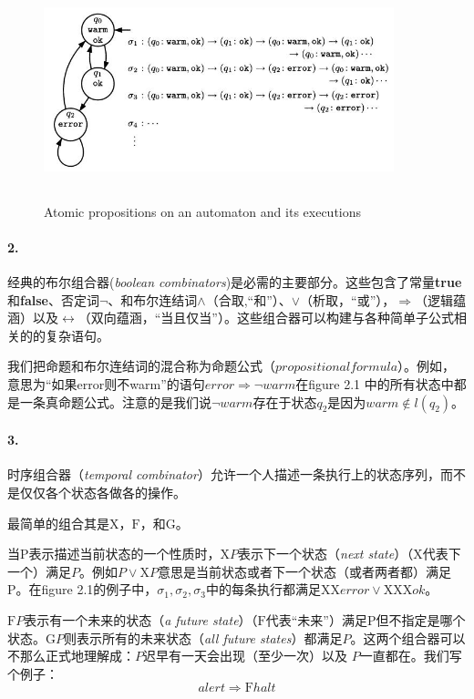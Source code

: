 \documentclass{book}
\begin{document}
    \begin{figure}
        \centering
        \includegraphics[height=2.5in,width=4.0in]{2_1.jpg}
        \caption{Atomic propositions on an automaton and its executions}
    \end{figure}

    \paragraph{2.} 经典的布尔组合器({\itshape boolean combinators})是必需的主要部分。这些包含了常量\textbf{true}和\textbf{false}、否定词$\neg$、和布尔连结词$\wedge$（合取,“和”）、$\vee$（析取，“或”），$\Rightarrow$（逻辑蕴涵）以及$\leftrightarrow$（双向蕴涵，“当且仅当”）。这些组合器可以构建与各种简单子公式相关的的复杂语句。

    我们把命题和布尔连结词的混合称为命题公式（$propositional formula$）。例如，意思为“如果error则不warm”的语句$error \Rightarrow \neg warm$在figure 2.1 中的所有状态中都是一条真命题公式。注意的是我们说$\neg warm$存在于状态$q_2$是因为$warm \notin l(q_2)$。

    \paragraph{3.}时序组合器（{\itshape temporal combinator}）允许一个人描述一条执行上的状态序列，而不是仅仅各个状态各做各的操作。

    最简单的组合其是$\mathrm{X}$，$\mathrm{F}$，和$\mathrm{G}$。

    当P表示描述当前状态的一个性质时，$\mathrm{X}P$表示下一个状态（{\itshape next state}）（$\mathrm{X}$代表下一个）满足$P$。例如$P \vee \mathrm{X}P$意思是当前状态或者下一个状态（或者两者都）满足P。在figure 2.1的例子中，$\sigma_1, \sigma_2, \sigma_3$中的每条执行都满足$\mathrm{X}\mathrm{X}error \vee \mathrm{X}\mathrm{X}\mathrm{X} ok$。

    $\mathrm{F}P$表示有一个未来的状态（{\itshape a future state}）（$\mathrm{F}$代表“未来”）满足P但不指定是哪个状态。$\mathrm{G}P$则表示所有的未来状态（{\itshape all future states}）都满足$P$。这两个组合器可以不那么正式地理解成：$P$迟早有一天会出现（至少一次）以及 $P$一直都在。我们写个例子：
    \begin{equation*}
      alert \Rightarrow \mathrm{F} halt
    \end{equation*}
\end{document}
